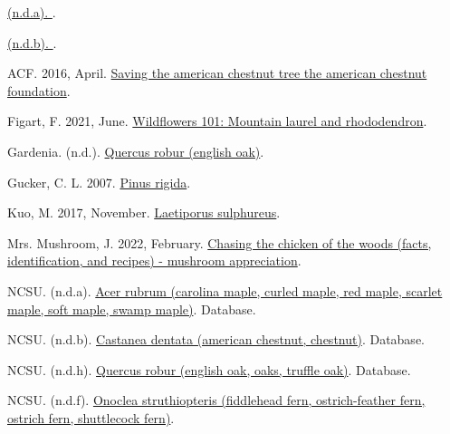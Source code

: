 \documentclass[
]{article}
\newlength{\cslhangindent}
\newlength{\cslentryspacingunit} %
\newenvironment{CSLReferences}[2] %
 {%
  \setlength{\parindent}{0pt}
  \ifodd #1
  \let\oldpar\par
  \def\par{\hangindent=\cslhangindent\oldpar}
  \fi
  \setlength{\parskip}{#2\cslentryspacingunit}
 }%
 {}
\begin{document}
\hypertarget{refs}{}
\begin{CSLReferences}{1}{0}
\leavevmode{}%
\href{https://plants.ces.ncsu.edu/plants/gaylussacia-baccata/}{(n.d.a). }.

\leavevmode{}%
\href{https://www.gardenia.net/plant/pinus-echinata}{(n.d.b). }.

\leavevmode{}%
ACF. 2016, April. \href{https://acf.org/}{Saving the american chestnut tree \textbar{} the american chestnut foundation}.

\leavevmode{}%
Figart, F. 2021, June. \href{https://www.smokiesinformation.org/news/wildflowers-101-mountain-laurel-and-rhododendron.html}{Wildflowers 101: Mountain laurel and rhododendron}.

\leavevmode{}%
Gardenia. (n.d.). \href{https://www.gardenia.net/plant/quercus-robur}{Quercus robur (english oak)}.

\leavevmode{}%
Gucker, C. L. 2007. \href{https://www.fs.fed.us/database/feis/plants/tree/pinrig/all.html\#Cone\%20survival\%20and\%20seedling\%20establishment:}{Pinus rigida}.

\leavevmode{}%
Kuo, M. 2017, November. \href{https://www.mushroomexpert.com/laetiporus_sulphureus.html}{Laetiporus sulphureus}.

\leavevmode{}%
Mrs. Mushroom, J. 2022, February. \href{https://www.mushroom-appreciation.com/chicken-of-the-woods.html}{Chasing the chicken of the woods (facts, identification, and recipes) - mushroom appreciation}.

\leavevmode{}%
NCSU. (n.d.a). \href{https://plants.ces.ncsu.edu/plants/acer-rubrum/}{Acer rubrum (carolina maple, curled maple, red maple, scarlet maple, soft maple, swamp maple)}. Database.

\leavevmode{}%
NCSU. (n.d.b). \href{https://plants.ces.ncsu.edu/plants/castanea-dentata/}{Castanea dentata (american chestnut, chestnut)}. Database.

\leavevmode{}%
NCSU. (n.d.h). \href{https://plants.ces.ncsu.edu/plants/quercus-robur/}{Quercus robur (english oak, oaks, truffle oak)}. Database.

\leavevmode{}%
NCSU. (n.d.f). \href{https://plants.ces.ncsu.edu/plants/onoclea-struthiopteris/}{Onoclea struthiopteris (fiddlehead fern, ostrich-feather fern, ostrich fern, shuttlecock fern)}.


\end{CSLReferences}
\end{document}
